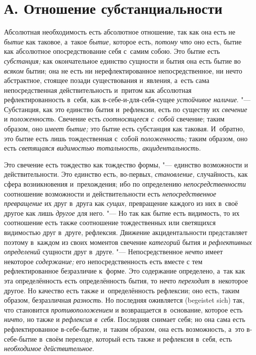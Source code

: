 \section[А. Отношение субстанциальности]{А. Отношение субстанциальности}

Абсолютная необходимость есть абсолютное
отношение, так как она есть не {\em бытие} как таковое,
а~такое {\em бытие,} которое есть,
{\em потому что} оно есть, бытие как абсолютное
опосредствование себя с~самим собою. Это бытие есть
{\em субстанция;} как окончательное единство сущности и
бытия она есть бытие во {\em всяком} бытии; она не есть
ни нерефлектированное непосредственное, ни нечто абстрактное, стоящее
позади существования и~явления, а~есть сама непосредственная
действительность и~притом как абсолютная рефлектированность в~себя, как
в-себе-и-для-себя-сущее {\em устойчивое наличие}. "---
Субстанция, как это единство бытия и~рефлексии, есть по существу их
{\em свечение} и {\em положенность}. Свечение есть
{\em соотносящееся с~собой} свечение; таким образом,
оно {\em имеет бытие;} это бытие есть субстанция как
таковая. И~обратно, это бытие есть лишь тождественная с~собой
{\em положенность;} таким образом, оно есть
{\em светящаяся видимостью тотальность, акцидентальность.}

Это свечение есть тождество как тождество формы, "--- единство возможности и
действительности. Это единство есть, во-первых,
{\em становление,} случайность, как сфера возникновения
и~прехождения; ибо по определению
{\em непосредственности} соотношение возможности и
действительности есть {\em непосредственное
превращение} их друг в~друга как {\em сущих,}
превращение каждого из них в~своё другое как лишь
{\em другое} для него. "--- Но так как бытие есть
видимость, то их соотношение есть также соотношение тождественных или
светящихся видимостью друг в~друге, рефлексия. Движение акцидентальности
представляет поэтому в~каждом из своих моментов свечение {\em категорий}
бытия и {\em рефлективных определений} сущности друг в~друге. "---
Непосредственное {\em нечто} имеет некоторое
{\em содержание;} его непосредственность есть вместе с
тем рефлектированное безразличие к~форме. Это содержание определено, а~так
как эта определённость есть определённость бытия, то нечто
{\em переходит} в~некоторое другое. Но качество есть
также и~определённость рефлексии; оно есть, таким образом, безразличная
{\em разность}. Но последняя оживляется (begeistet sich)
так, что становится {\em противоположением} и
возвращается в~основание, которое есть {\em ничто,} но
также и {\em рефлексия в~себя}. Последняя снимает себя;
но она сама есть рефлектированное в-себе-бытие, и~таким образом, она есть
возможность, а~это в-себе-бытие в~своём переходе, который есть также и
рефлексия в~себя, есть {\em необходимое действительное}.

